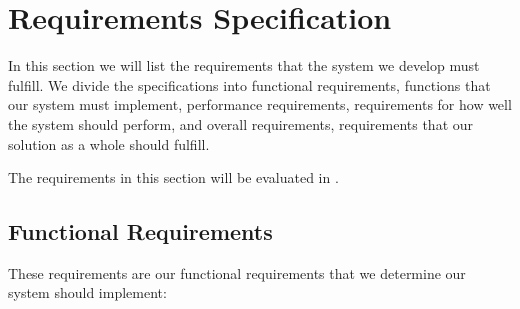 \section{Requirements Specification}
\label{sec:requirements-specification}

In this section we will list the requirements that the system we develop must fulfill.
We divide the specifications into functional requirements, 
\ie functions that our system must implement,
performance requirements,
\ie requirements for how well the system should perform,
and overall requirements, 
\ie requirements that our solution as a whole should fulfill.

The requirements in this section will be evaluated in .

\subsection{Functional Requirements}
These requirements are our functional requirements that we determine our system should implement:
